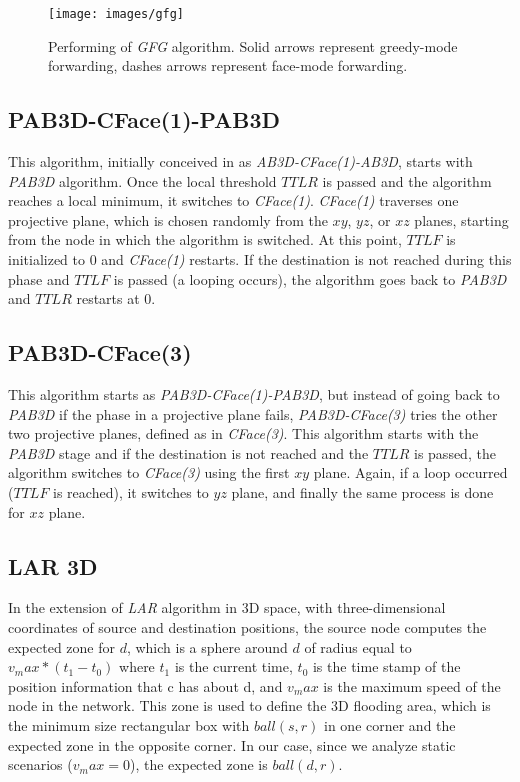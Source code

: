 \documentclass[journal,comsoc]{IEEEtran}
\begin{document}
\begin{figure}[!t]
\centering
\texttt{[image: images/gfg]}
\caption{Performing of \emph{GFG} algorithm. Solid arrows represent greedy-mode forwarding, dashes arrows represent face-mode forwarding.}
  \label{fig:gfg}
\end{figure}

\subsection{PAB3D-CFace(1)-PAB3D}
This algorithm, initially conceived in \cite{abdallah:random} as \emph{AB3D-CFace(1)-AB3D}, starts with \emph{PAB3D} algorithm. Once the local threshold \(TTLR\) is passed and the algorithm reaches a local minimum, it switches to \emph{CFace(1)}. \emph{CFace(1)} traverses one projective plane, which is chosen randomly from the \(xy\), \(yz\), or \(xz\) planes, starting from the node in which the algorithm is switched. At this point, \(TTLF\) is initialized to 0 and \emph{CFace(1)} restarts. If the destination is not reached during this phase and \(TTLF\) is passed (a looping occurs), the algorithm goes back to \emph{PAB3D} and \(TTLR\) restarts at 0.

\subsection{PAB3D-CFace(3)}
This algorithm starts as \emph{PAB3D-CFace(1)-PAB3D}, but instead of going back to \emph{PAB3D} if the phase in a projective plane fails, \emph{PAB3D-CFace(3)} tries the other two projective planes, defined as in \emph{CFace(3)}. This algorithm starts with the \emph{PAB3D} stage and if the destination is not reached and the \(TTLR\) is passed, the algorithm switches to \emph{CFace(3)} using the first \(xy\) plane. Again, if a loop occurred (\(TTLF\) is reached), it switches to \(yz\) plane, and finally the same process is done for \(xz\) plane.

\subsection{LAR 3D}
In the extension of \emph{LAR} algorithm in 3D space, with three-dimensional coordinates of source and destination positions, the source node computes the expected zone for \(d\), which is a sphere around \(d\) of radius equal to \(v_max * (t_1 - t_0)\) where \(t_1\) is the current time, \(t_0\) is the time stamp of the position information that c has about d, and \(v_max\) is the maximum speed of the node in the network. This zone is used to define the 3D flooding area, which is the minimum size rectangular box with \(ball(s,r)\) in one corner and the expected zone in the opposite corner. In our case, since we analyze static scenarios (\(v_max = 0\)), the expected zone is \(ball(d,r)\).
\end{document}
